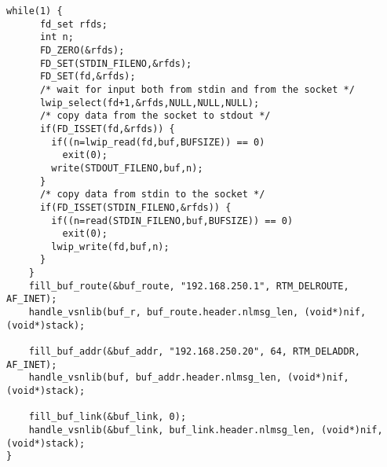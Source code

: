 \begin{lstlisting}[style=CscriptStyle]
    while(1) {
      fd_set rfds;
      int n;
      FD_ZERO(&rfds);
      FD_SET(STDIN_FILENO,&rfds);
      FD_SET(fd,&rfds);
      /* wait for input both from stdin and from the socket */
      lwip_select(fd+1,&rfds,NULL,NULL,NULL);
      /* copy data from the socket to stdout */
      if(FD_ISSET(fd,&rfds)) {
        if((n=lwip_read(fd,buf,BUFSIZE)) == 0)
          exit(0);
        write(STDOUT_FILENO,buf,n);
      }
      /* copy data from stdin to the socket */
      if(FD_ISSET(STDIN_FILENO,&rfds)) {
        if((n=read(STDIN_FILENO,buf,BUFSIZE)) == 0)
          exit(0);
        lwip_write(fd,buf,n);
      }
    }
    fill_buf_route(&buf_route, "192.168.250.1", RTM_DELROUTE, AF_INET);
    handle_vsnlib(buf_r, buf_route.header.nlmsg_len, (void*)nif, (void*)stack);

    fill_buf_addr(&buf_addr, "192.168.250.20", 64, RTM_DELADDR, AF_INET);
    handle_vsnlib(buf, buf_addr.header.nlmsg_len, (void*)nif, (void*)stack);

    fill_buf_link(&buf_link, 0);
    handle_vsnlib(&buf_link, buf_link.header.nlmsg_len, (void*)nif, (void*)stack);
}
\end{lstlisting}

